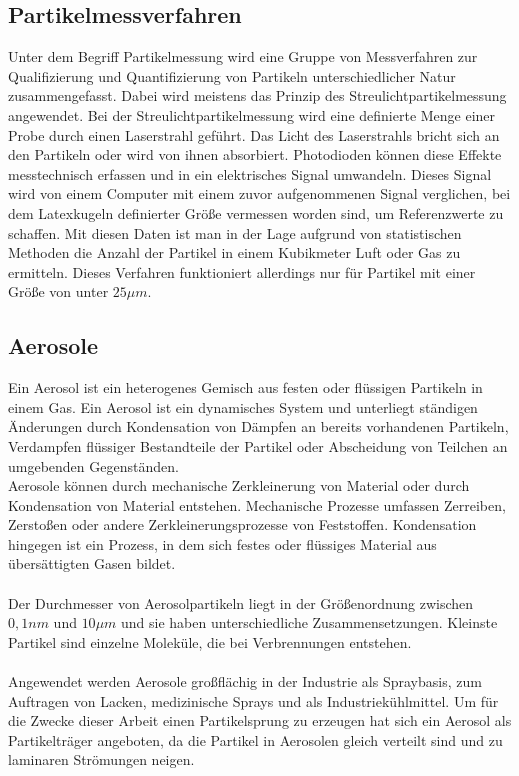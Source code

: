 \subsection{Partikelmessverfahren}
Unter dem Begriff Partikelmessung wird eine Gruppe von Messverfahren zur Qualifizierung und Quantifizierung von Partikeln unterschiedlicher Natur zusammengefasst. Dabei wird meistens das Prinzip des Streulichtpartikelmessung angewendet. Bei der Streulichtpartikelmessung wird eine definierte Menge einer Probe durch einen Laserstrahl gef\"{u}hrt. Das Licht des Laserstrahls bricht sich an den Partikeln oder wird von ihnen absorbiert. Photodioden k\"{o}nnen diese Effekte messtechnisch erfassen und in ein elektrisches Signal umwandeln. Dieses Signal wird von einem Computer mit einem zuvor aufgenommenen Signal verglichen, bei dem Latexkugeln definierter Gr\"{o}{\ss}e vermessen worden sind, um Referenzwerte zu schaffen. Mit diesen Daten ist man in der Lage aufgrund von statistischen Methoden die Anzahl der Partikel in einem Kubikmeter Luft oder Gas zu ermitteln. Dieses Verfahren funktioniert allerdings nur f\"{u}r Partikel mit einer Gr\"{o}{\ss}e von unter \(25 \mu m\).

\subsection{Aerosole}
Ein Aerosol ist ein heterogenes Gemisch aus festen oder fl\"{u}ssigen Partikeln in einem Gas. Ein Aerosol ist ein dynamisches System und unterliegt st\"{a}ndigen \"{A}nderungen durch Kondensation von D\"{a}mpfen an bereits vorhandenen Partikeln, Verdampfen fl\"{u}ssiger Bestandteile der Partikel oder Abscheidung von Teilchen an umgebenden Gegenst\"{a}nden.\\
Aerosole k\"{o}nnen durch mechanische Zerkleinerung von Material oder durch Kondensation von Material entstehen. Mechanische Prozesse umfassen Zerreiben, Zerstoßen oder andere Zerkleinerungsprozesse von Feststoffen. Kondensation hingegen ist ein Prozess, in dem sich festes oder fl\"{u}ssiges Material aus \"{u}bers\"{a}ttigten Gasen bildet.
\\\\
Der Durchmesser von Aerosolpartikeln liegt in der Gr\"{o}{\ss}enordnung zwischen \(0,1 nm\) und \(10 \mu m\) und sie haben unterschiedliche Zusammensetzungen. Kleinste Partikel sind einzelne Molek\"{u}le, die bei Verbrennungen entstehen.
\\\\
Angewendet werden Aerosole gro{\ss}fl\"{a}chig in der Industrie als Spraybasis, zum Auftragen von Lacken, medizinische Sprays und als Industriek\"{u}hlmittel. Um f\"{u}r die Zwecke dieser Arbeit einen Partikelsprung zu erzeugen hat sich ein Aerosol als Partikeltr\"{a}ger angeboten, da die Partikel in Aerosolen gleich verteilt sind und zu laminaren Str\"{o}mungen neigen.